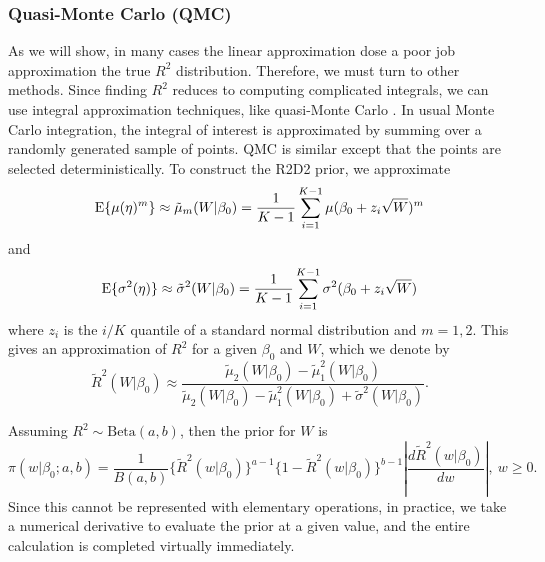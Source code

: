 \documentclass[12pt]{article}
\begin{document}
\subsubsection{Quasi-Monte Carlo (QMC)}\label{s:QMC}
As we will show, in many cases the linear approximation dose a poor job approximation the true $R^2$ distribution. Therefore, we must turn to other methods. Since finding $R^2$ reduces to computing complicated integrals, we can use integral approximation techniques, like quasi-Monte Carlo  \citep[QMC; e.g.,][]{Morokoff1995}. In usual Monte Carlo integration, the integral of interest is approximated by summing over a randomly generated sample of points.
QMC is similar except that the points are selected deterministically. To construct the R2D2 prior, we approximate
\begin{equation}\label{eq:qmc1}
    \mbox{E}\{\mu(\eta)^m\}
    \approx {\tilde \mu}_m(W|\beta_0) = \frac1{K-1}\sum_{i=1}^{K-1} \mu(\beta_0+z_i\sqrt{W})^m
\end{equation}
and
\begin{equation}\label{eq:qmc2}
    \mbox{E}\{\sigma^2(\eta)\}
    \approx {\tilde \sigma}^2(W|\beta_0)=\frac1{K-1}\sum_{i=1}^{K-1} \sigma^2(\beta_0+z_i\sqrt{W})
\end{equation}
where $z_i$ is the $i/K$ quantile of a standard normal distribution and $m=1,2$.  This gives an approximation of $R^2$ for a given $\beta_0$ and $W$, which we denote by
\begin{equation}\label{eq:qmc3}
    {\tilde R}^2(W|\beta_0)
    \approx\frac{{\tilde \mu}_2(W|\beta_0)-{\tilde \mu}_1^2(W|\beta_0)}
    {{\tilde \mu}_2(W|\beta_0)-{\tilde \mu}_1^2(W|\beta_0) + {\tilde \sigma}^2(W|\beta_0)}.
\end{equation} %

Assuming $R^2\sim\mbox{Beta}(a,b)$, then the prior for $W$ is
\begin{equation}
    \pi(w|\beta_0;a,b)
    =\frac1{B(a,b)}\{\tilde R^2(w|\beta_0)\}^{a-1}\{1-\tilde R^2(w|\beta_0)\}^{b-1} \left|\frac{d \tilde R^2(w|\beta_0)}{dw}\right|,\ w\geq 0.
\end{equation}
Since this cannot be represented with elementary operations, in practice, we take a numerical derivative to evaluate the prior at a given value, and the entire calculation is completed virtually immediately.
\end{document}
